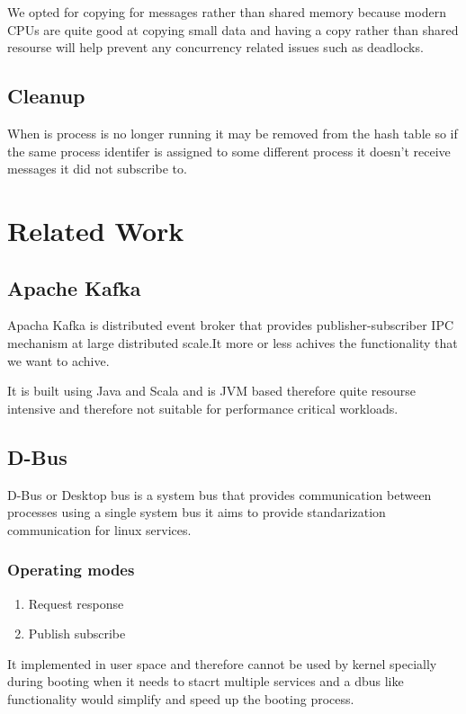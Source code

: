 \documentclass[12pt]{report}
\begin{document}
	We opted for copying for messages rather than shared memory because
	modern CPUs are quite good at copying small data and having a copy rather than
	shared resourse will help prevent any concurrency related issues such as deadlocks.	

	\section{Cleanup}
	When is process is no longer running it may be removed from the hash table
	so if the same process identifer is assigned to some different process it 
	doesn't receive messages it did not subscribe to.
    
	\chapter{Related Work}
	\section{Apache Kafka}
	Apacha Kafka is distributed event broker that provides publisher-subscriber 
	IPC mechanism at large distributed scale.It more or less achives the functionality 
	that we want to achive.
	
	It is built using Java and Scala and is JVM based therefore quite resourse intensive
	and therefore not suitable for performance critical workloads.
	
	\section{D-Bus}
	D-Bus or Desktop bus is a system bus that provides communication between processes
	using a single system bus it aims to provide standarization communication for 
	linux services.
	
	\subsection{Operating modes} 
	\begin{enumerate}
		\item Request response
		\item Publish subscribe
	\end{enumerate} 
	
	It implemented in user space and therefore cannot be used by kernel specially during
	booting when it needs to stacrt multiple services and a dbus like functionality would
	simplify and speed up the booting process.
	
\end{document}
